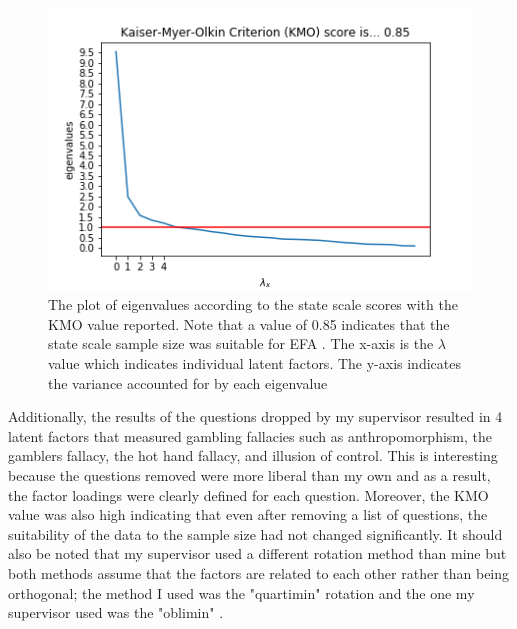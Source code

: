 \documentclass[twoside,twocolumn]{article}
\begin{document}
\begin{figure}
  \includegraphics[scale=0.3, width=\columnwidth]{scree_test.png}
  \caption{The plot of eigenvalues according to the state scale scores with the KMO value reported. Note that a value of 0.85 indicates that the state scale sample size was suitable for EFA \cite{efa}. The x-axis is the $\lambda$ value which indicates individual latent factors. The y-axis indicates the variance accounted for by each eigenvalue \cite{efa}}
  \centering
\end{figure}


Additionally, the results of the questions dropped by my supervisor resulted in 4 latent factors that measured gambling fallacies such as anthropomorphism, the gamblers fallacy, the hot hand fallacy, and  illusion of control. This is interesting because the questions removed were more liberal than my own and as a result, the factor loadings were clearly defined for each question. Moreover, the KMO value was also high indicating that even after removing a list of questions, the suitability of the data to the sample size had not changed significantly. It should also be noted that my supervisor used a different rotation method than mine but both methods assume that the factors are related to each other rather than being orthogonal; the method I used was the "quartimin" rotation and the one my supervisor used was the "oblimin" \cite{efa}. 
\end{document}

